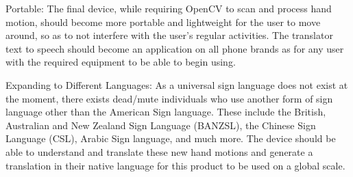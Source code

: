 \documentclass{article}
\begin{document}
Portable:
The final device, while requiring OpenCV to scan and process hand motion, should become more portable and lightweight for the user to move around, so as to not interfere with the user’s regular activities. The translator text to speech should become an application on all phone brands as for any user with the required equipment to be able to begin using.

Expanding to Different Languages:
As a universal sign language does not exist at the moment, there exists dead/mute individuals who use another form of sign language other than the American Sign language. These include the British, Australian and New Zealand Sign Language (BANZSL), the Chinese Sign Language (CSL), Arabic Sign language, and much more. The device should be able to understand and translate these new hand motions and generate a translation in their native language for this product to be used on a global scale.
\end{document}
